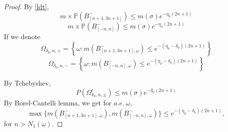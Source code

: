 \begin{proof}
  By \eqref{ldt},
\[
m\times\mathbb{P}(B_{[n+1,3n+1]}^-)\leq m(\sigma)e^{-\eta_0(2n+1)}
\]
\[
m\times\mathbb{P}(B_{[-n,n]}^-)\leq m(\sigma)e^{-\eta_0(2n+1)}
\]
  If we denote
    \[
      \Omega_{\delta_0,n,+}=\left\{\omega:m(B_{[n+1,3n+1],\omega}^-)\leq e^{-(\eta_0-\delta_0)(2n+1)}\right\}
    \]
    \[
    \Omega_{\delta_0,n,-}=\left\{\omega:m(B_{[-n,n],\omega}^-)\leq e^{-(\eta_0-\delta_0)(2n+1)}\right\}
    \]

  By Tchebyshev,
  \[
      P(\Omega_{\delta_0,n,\pm}^c)
      \leq m(\sigma)e^{-\delta_0(2n+1)}
  \]
By Borel-Cantelli lemma, we get for $a.e.~\omega$,
\[
\max\{m(B_{[n+1,3n+1],\omega}^-),m(B_{[-n,n],\omega}^-)\}\leq e^{-(\eta_0-\delta_0)(2n+1)},
\]
for $n>N_1(\omega)$.
\end{proof}

